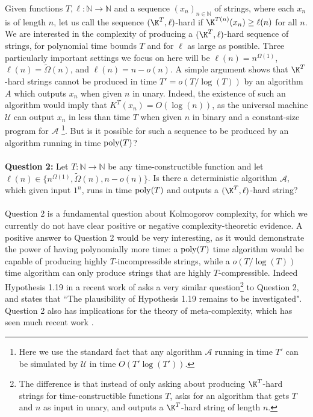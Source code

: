 Given functions $T,\ell: \mathbb{N} \rightarrow \mathbb{N}$ and a sequence $(x_n)_{n\in \mathbb{N}}$ of strings, where each $x_n$ is of length $n$, let us call the sequence $(\K^T,\ell)$-hard if $\K^{T(n)}(x_n) \geq \ell(n)$ for all $n$. We are interested in the complexity of producing a $(\K^T,\ell)$-hard sequence of strings, for polynomial time bounds $T$ and for $\ell$ as large as possible. Three particularly important settings we focus on here will be $\ell(n) = n^{\Omega(1)}$, $\ell(n) = \tilde{\Omega}(n)$, and $\ell(n) = n - o(n)$. A simple argument shows that $\K^T$-hard strings cannot be produced in time $T' = o(T/\log(T))$ by an algorithm $A$ which outputs $x_n$ when given $n$ in unary. Indeed, the existence of such an algorithm would imply that $K^T(x_n) = O(\log(n))$, as the universal machine $\mathcal{U}$ can output $x_n$ in less than time $T$ when given $n$ in binary and a constant-size program for $\mathcal{A}$ \footnote{Here we use the standard fact that any algorithm $\mathcal{A}$ running in time $T'$ can be simulated by $\mathcal{U}$ in time $O(T' \log(T'))$.}. But is it possible for such a sequence to be produced by an algorithm running in time $\mathrm{poly}(T)$? \\
\\
{\bf \noindent Question 2:} Let $T: \mathbb{N} \rightarrow \mathbb{N}$ be any time-constructible function and let $\ell(n) \in \{ n^{\Omega(1)}, \tilde{\Omega}(n), n - o(n)\}$. Is there a deterministic algorithm $\mathcal{A}$, which given input $1^n$, runs in time $\mathrm{poly}(T)$ and outputs a $(\K^T,\ell)$-hard string? \\
\\
Question 2 is a fundamental question about Kolmogorov complexity, for which we currently do not have clear positive or negative complexity-theoretic evidence. A positive answer to Question 2 would be very interesting, as it would demonstrate the power of having polynomially more time: a $\mathrm{poly}(T)$ time algorithm would be capable of producing highly $T$-incompressible strings, while a $o(T/\log(T))$ time algorithm can only produce strings that are highly $T$-compressible. Indeed Hypothesis 1.19 in a recent work of \cite{RSW22} asks a very similar question\footnote{The difference is that instead of only asking about producing $\K^T$-hard strings for time-constructible functions $T$, \cite{RSW22} asks for an algorithm that gets $T$ and $n$ as input in unary, and outputs a $\K^T$-hard string of length $n$.} to Question 2, and states that ``The plausibility of Hypothesis 1.19 remains to be investigated". Question 2 also has implications for the theory of meta-complexity, which has seen much recent work \cite{Allender17, Hirahara22, LO22}.

